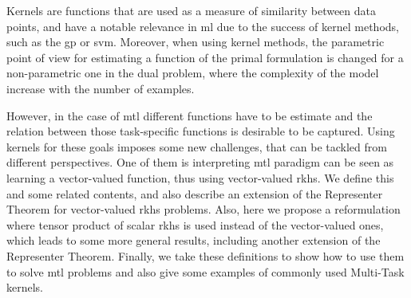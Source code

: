 
Kernels are functions that are used as a measure of similarity between data points, and have a notable relevance in \acrshort{ml} due to the success of kernel methods, such as the \acrshort{gp} or \acrshort{svm}. 
%
Moreover, when using kernel methods, the parametric point of view for estimating a function of the primal formulation is changed for a non-parametric one in the dual problem, where the complexity of the model increase with the number of examples.

However, in the case of \acrshort{mtl} different functions have to be estimate and the relation between those task-specific functions is desirable to be captured. Using kernels for these goals imposes some new challenges, that can be tackled from different perspectives. 
One of them is interpreting \acrshort{mtl} paradigm can be seen as learning a vector-valued function, thus using vector-valued \acrfull{rkhs}. We define this and some related contents, and also describe an extension of the Representer Theorem for vector-valued \acrfull{rkhs} problems.
%
Also, here we propose a reformulation where tensor product of scalar \acrfull{rkhs} is used instead of the vector-valued ones, which leads to some more general results, including another extension of the Representer Theorem.
%
Finally, we take these definitions to show how to use them to solve \acrshort{mtl} problems and also give some examples of commonly used Multi-Task kernels.


